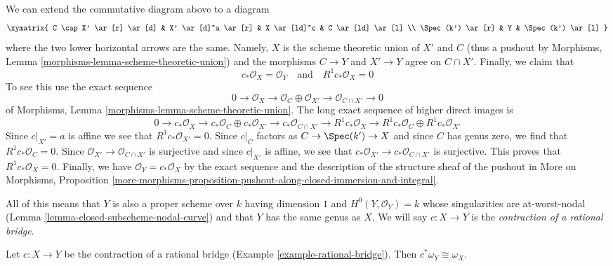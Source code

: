 \begin{example}
\medskip\noindent
We can extend the commutative diagram above to a diagram
$$
\xymatrix{
C \cap X' \ar[r] \ar[d] &
X' \ar[d]^a \ar[r] & X \ar[ld]^c &
C \ar[ld] \ar[l] \\
\Spec(k') \ar[r] &
Y &
\Spec(k') \ar[l]
}
$$
where the two lower horizontal arrows are the same. Namely, $X$ is the
scheme theoretic union of $X'$ and $C$ (thus a pushout by
Morphisms, Lemma \ref{morphisms-lemma-scheme-theoretic-union})
and the morphisms $C \to Y$ and $X' \to Y$ agree on $C \cap X'$.
Finally, we claim that
$$
c_*\mathcal{O}_X = \mathcal{O}_Y
\quad\text{and}\quad
R^1c_*\mathcal{O}_X = 0
$$
To see this use the exact sequence
$$
0 \to \mathcal{O}_X \to
\mathcal{O}_C \oplus \mathcal{O}_{X'} \to
\mathcal{O}_{C \cap X'} \to 0
$$
of Morphisms, Lemma \ref{morphisms-lemma-scheme-theoretic-union}.
The long exact sequence of higher direct images is
$$
0 \to c_*\mathcal{O}_X \to c_*\mathcal{O}_C \oplus c_*\mathcal{O}_{X'} \to
c_*\mathcal{O}_{C \cap X'} \to
R^1c_*\mathcal{O}_X \to
R^1c_*\mathcal{O}_C \oplus R^1c_*\mathcal{O}_{X'}
$$
Since $c|_{X'} = a$ is affine we see that
$R^1c_*\mathcal{O}_{X'} = 0$.
Since $c|_C$ factors as $C \to \Spec(k') \to X$ and since
$C$ has genus zero, we find that $R^1c_*\mathcal{O}_C = 0$.
Since $\mathcal{O}_{X'} \to \mathcal{O}_{C \cap X'}$ is
surjective and since $c|_{X'}$ is affine, we see that
$c_*\mathcal{O}_{X'} \to c_*\mathcal{O}_{C \cap X'}$
is surjective. This proves that $R^1c_*\mathcal{O}_X = 0$.
Finally, we have
$\mathcal{O}_Y = c_*\mathcal{O}_X$ by
the exact sequence and
the description of the structure sheaf of the pushout
in More on Morphisms, Proposition
\ref{more-morphisms-proposition-pushout-along-closed-immersion-and-integral}.

\medskip\noindent
All of this means that $Y$ is also a proper scheme over $k$
having dimension $1$ and $H^0(Y, \mathcal{O}_Y) = k$
whose singularities are at-worst-nodal
(Lemma \ref{lemma-closed-subscheme-nodal-curve})
and that $Y$ has the same genus as $X$.
We will say $c : X \to Y$ is the
{\it contraction of a rational bridge}.
\end{example}

\begin{lemma}
\label{lemma-rational-bridge-canonical}
Let $c : X \to Y$ be the contraction of a rational bridge
(Example \ref{example-rational-bridge}).
Then $c^*\omega_Y \cong \omega_X$.
\end{lemma}

